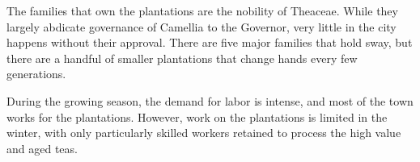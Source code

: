 The families that own the plantations are the nobility of Theaceae.
While they largely abdicate governance of Camellia to the Governor, very little in the city happens without their approval.
There are five major families that hold sway, but there are a handful of smaller plantations that change hands every few generations.

During the growing season, the demand for labor is intense, and most of the town works for the plantations.
However, work on the plantations is limited in the winter, with only particularly skilled workers retained to process the high value and aged teas.

